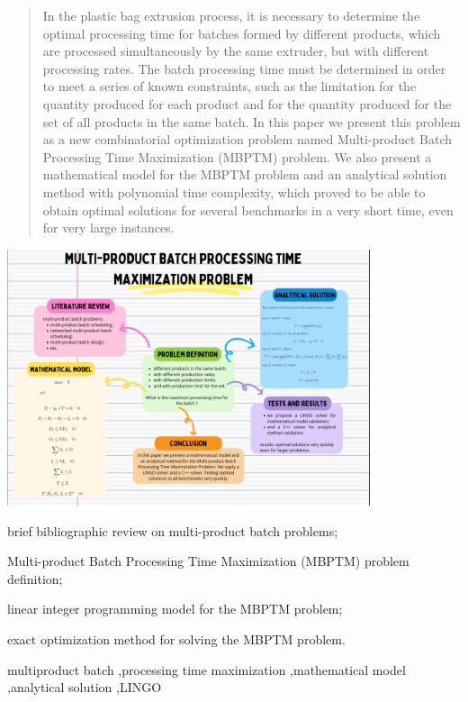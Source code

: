 \documentclass[authoryear,manuscript,12pt]{elsarticle}
\begin{document}
\begin{frontmatter}
\begin{abstract}
In the plastic bag extrusion process, it is necessary to determine the optimal processing time for batches formed by different products, which are processed simultaneously by the same extruder, but with different processing rates. The batch processing time must be determined in order to meet a series of known constraints, such as the limitation for the quantity produced for each product and for the quantity produced for the set of all products in the same batch. In this paper we present this problem as a new combinatorial optimization problem named Multi-product Batch Processing Time Maximization (MBPTM) problem. We also present a mathematical model for the MBPTM problem and an analytical solution method with polynomial time complexity, which proved to be able to obtain optimal solutions for several benchmarks in a very short time, even for very large instances.
\end{abstract}
\begin{graphicalabstract}
\includegraphics[width=0.8\textwidth]{graphical.png}
\end{graphicalabstract}

\begin{highlights}
\item brief bibliographic review on multi-product batch problems;
\item Multi-product Batch Processing Time Maximization (MBPTM) problem definition;
\item linear integer programming model for the MBPTM problem;
\item exact optimization method for solving the MBPTM problem.
\end{highlights}

\begin{keyword}
multiproduct batch \sep processing time maximization \sep mathematical model \sep analytical solution \sep LINGO
\end{keyword}
\end{frontmatter}
\end{document}
